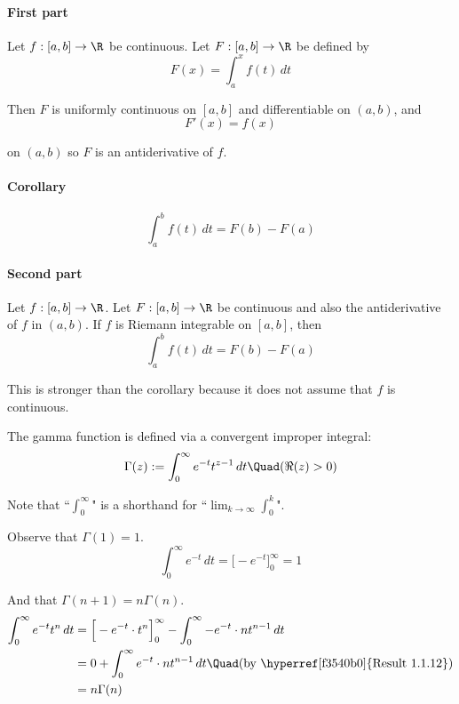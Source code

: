 \label{b869dc0}

\paragraph{First part} Let $f:[a,b]\to\R$ be continuous. Let
$F:[a,b]\to\R$ be defined by
$$F(x)=\int_a^xf(t)\,dt$$

Then $F$ is uniformly continuous on $[a,b]$ and differentiable on
$(a,b)$, and
$$F'(x)=f(x)$$

on $(a,b)$ so $F$ is an antiderivative of $f$.

\paragraph{Corollary}
$$\int_a^bf(t)\,dt=F(b)-F(a)$$

\paragraph{Second part} Let $f:[a,b]\to\R$. Let $F:[a,b]\to\R$ be
continuous and also the antiderivative of $f$ in $(a,b)$. If $f$ is
Riemann integrable on $[a,b]$, then
$$\int_a^bf(t)\,dt=F(b)-F(a)$$

This is stronger than the corollary because it does not assume that
$f$ is continuous.

\label{ce1fa3f}

The gamma function is defined via a convergent improper integral:
$$
	\Gamma(z):=\int_0^\infty e^{-t}t^{z-1}\,dt\Quad(\Re(z)>0)
$$

Note that ``$\displaystyle\int_0^\infty$" is a shorthand for
``$\displaystyle\lim_{k\to\infty}\int_0^k$".

Observe that $\Gamma(1)=1$.
$$\int_0^\infty e^{-t}\,dt=\Big[-e^{-t}\Big]_0^\infty=1$$

And that $\Gamma(n+1)=n\Gamma(n)$.
\begin{align*}
	\int_0^\infty e^{-t}t^n\,dt
	 & = \Big[-e^{-t}\cdot t^n\Big]_0^\infty-\int_0^\infty-e^{-t}\cdot nt^{n-1}\,dt                  \\
	 & = 0+\int_0^\infty e^{-t}\cdot nt^{n-1}\,dt \Quad\text{(by \hyperref[f3540b0]{Result 1.1.12})} \\
	 & = n\Gamma(n)
\end{align*}